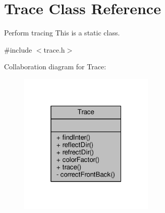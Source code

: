 \hypertarget{classTrace}{}\section{Trace Class Reference}
\label{classTrace}


Perform tracing This is a static class.  




{\ttfamily \#include $<$trace.\+h$>$}



Collaboration diagram for Trace\+:\nopagebreak
\begin{figure}[H]
\begin{center}
\leavevmode
\includegraphics[width=184pt]{classTrace__coll__graph}
\end{center}
\end{figure}

